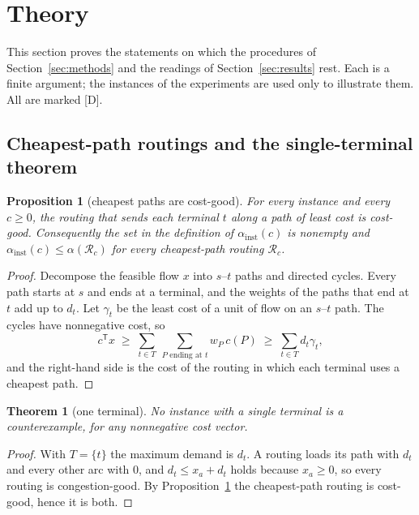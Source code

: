 \documentclass[11pt]{article}
\newtheorem{theorem}{Theorem}
\newtheorem{proposition}{Proposition}
\theoremstyle{remark}
\begin{document}
\section{Theory}
\label{sec:theory}

This section proves the statements on which the procedures of Section~\ref{sec:methods} and the readings of Section~\ref{sec:results} rest. Each is a
finite argument; the instances of the experiments are used only to illustrate them. All are marked [D].

\subsection{Cheapest-path routings and the single-terminal theorem}
\label{sec:theory-single}

\begin{proposition}[cheapest paths are cost-good]
\label{prop:cheapest}
For every instance and every $c\ge0$, the routing that sends each terminal $t$ along a path of least cost is cost-good. Consequently the set in the
definition of $\alpha_{\mathrm{inst}}(c)$ is nonempty and $\alpha_{\mathrm{inst}}(c)\le\alpha(\mathcal R_c)$ for every cheapest-path routing $\mathcal R_c$.
\end{proposition}

\begin{proof}
Decompose the feasible flow $x$ into $s$--$t$ paths and directed cycles. Every path starts at $s$ and ends at a terminal, and the weights of the paths that end at
$t$ add up to $d_t$. Let $\gamma_t$ be the least cost of a unit of flow on an $s$--$t$ path. The cycles have nonnegative cost, so
\[
c^{\mathsf T}x\;\ge\;\sum_{t\in T}\ \sum_{P\text{ ending at }t}w_P\,c(P)\;\ge\;\sum_{t\in T}d_t\gamma_t ,
\]
and the right-hand side is the cost of the routing in which each terminal uses a cheapest path.
\end{proof}

\begin{theorem}[one terminal]
\label{thm:single}
No instance with a single terminal is a counterexample, for any nonnegative cost vector.
\end{theorem}

\begin{proof}
With $T=\{t\}$ the maximum demand is $d_t$. A routing loads its path with $d_t$ and every other arc with $0$, and $d_t\le x_a+d_t$ holds because $x_a\ge0$, so every
routing is congestion-good. By Proposition~\ref{prop:cheapest} the cheapest-path routing is cost-good, hence it is both.
\end{proof}
\end{document}
